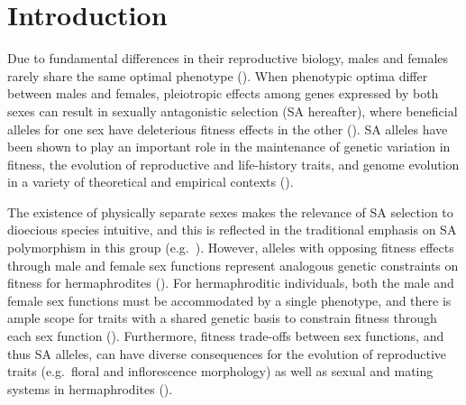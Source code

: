 \documentclass{article}
\begin{document}
\newpage{}


\section*{Introduction}

Due to fundamental differences in their reproductive biology, males and females rarely share the same optimal phenotype (\citealt{Parker1979, KokoJennions2008}). When phenotypic optima differ between males and females, pleiotropic effects among genes expressed by both sexes can result in sexually antagonistic selection (SA hereafter), where beneficial alleles for one sex have deleterious fitness effects in the other (\citealt{Kidwell1977, Rice1992, ConnClark2012}). SA alleles have been shown to play an important role in the maintenance of genetic variation in fitness, the evolution of reproductive and life-history traits, and genome evolution in a variety of theoretical and empirical contexts (\citealt{Barson2015, BondChen2009, CoxCals2010, CharlesworthHughes1999, ConnClark2012, Fry2010, Prout2000, Rice1992, RiceChipp2001}). 

The existence of physically separate sexes makes the relevance of SA selection to dioecious species intuitive, and this is reflected in the traditional emphasis on SA polymorphism in this group (e.g.~\citealt{Kidwell1977, Rice1992, Prout2000, ConnClark2012}). However, alleles with opposing fitness effects through male and female sex functions represent analogous genetic constraints on fitness for hermaphrodites (\citealt{Abbott2011, JordanConn2014,Tazzyman2015}). For hermaphroditic individuals, both the male and female sex functions must be accommodated by a single phenotype, and there is ample scope for traits with a shared genetic basis to constrain fitness through each sex function (\citealt{Abbott2011, Barrett2002, Conner2006, Sicard2011}). Furthermore, fitness trade-offs between sex functions, and thus SA alleles, can have diverse consequences for the evolution of reproductive traits (e.g.~floral and inflorescence morphology) as well as sexual and mating systems in hermaphrodites (\citealt{LloydWebb1986,WebbLloyd1986, Barrett2002, Abbott2011, Charlesworth1978, HarderBarrett2006, Goodwillie2005}).
\end{document}

